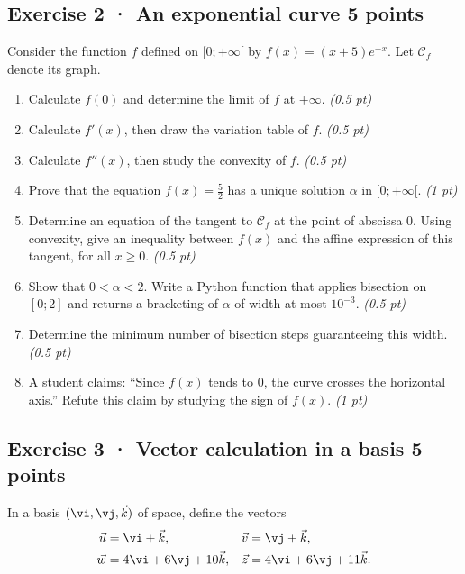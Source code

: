\subsection*{Exercise 2 · An exponential curve \hfill 5 points}Consider the function $f$ defined on $[0;+\infty[$ by $f(x)=(x+5)e^{-x}$. Let $\mathcal C_f$ denote its graph.

\begin{enumerate}

\item Calculate $f(0)$ and determine the limit of $f$ at $+\infty$. \hfill\textit{(0.5 pt)}

\item Calculate $f'(x)$, then draw the variation table of $f$. \hfill\textit{(0.5 pt)}

\item Calculate $f''(x)$, then study the convexity of $f$. \hfill\textit{(0.5 pt)}

\item Prove that the equation $f(x)=\frac{5}{2}$ has a unique solution $\alpha$ in $[0;+\infty[$. \hfill\textit{(1 pt)}

\item Determine an equation of the tangent to $\mathcal C_f$ at the point of abscissa $0$. Using convexity, give an inequality between $f(x)$ and the affine expression of this tangent, for all $x\ge0$. \hfill\textit{(0.5 pt)}

\item Show that $0<\alpha<2$. Write a Python function that applies bisection on $[0;2]$ and returns a bracketing of $\alpha$ of width at most $10^{-3}$. \hfill\textit{(0.5 pt)}

\item Determine the minimum number of bisection steps guaranteeing this width. \hfill\textit{(0.5 pt)}

\clearpage\item A student claims: ``Since $f(x)$ tends to $0$, the curve crosses the horizontal axis.'' Refute this claim by studying the sign of $f(x)$. \hfill\textit{(1 pt)}

\end{enumerate}

\clearpage{}\par

\subsection*{Exercise 3 · Vector calculation in a basis \hfill 5 points}In a basis $(\vi,\vj,\vec k)$ of space, define the vectors
\[\begin{aligned}\vec u&=\vi+\vec k,&\vec v&=\vj+\vec k,\\
\vec w&=4\vi+6\vj+10\vec k,&\vec z&=4\vi+6\vj+11\vec k.\end{aligned}\]

